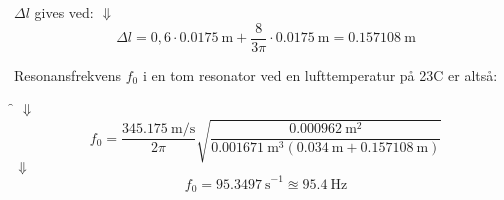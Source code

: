$\Delta l$ gives ved: \deltal
$\Downarrow$
\begin{equation}
		\Delta l = 0,6 \cdot {\SI{0,0175}{\meter}} + \frac{8}{3\pi} \cdot {\SI{0,0175}{\meter}} = {\SI{0,157108}{\meter}} 
\end{equation}

Resonansfrekvens $f_{0}$ i en tom resonator ved en lufttemperatur på 23\degree C er altså:

\f
$\Downarrow$   
\begin{equation}
		f_{0} = \frac{\SI{345,175}{\meter / \second}}{2\pi}\sqrt{\frac{\SI{0,000962}{\meter^{2}}}{{\SI{0,001671}{\meter^{3}}}({\SI{0,034}{\meter}}+{\SI{0,157108}{\meter}})}} 
	\end{equation}	
$\Downarrow$
\begin{equation}
	f_{0} = {\SI{95,3497}{\second}^{-1}} \approxeq {\SI{95,4}{\hertz}} 	
	\end{equation}
	















